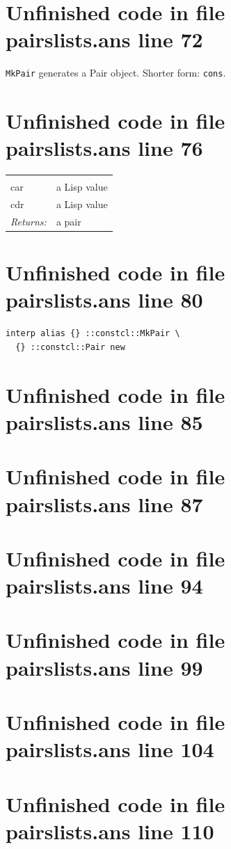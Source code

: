 \documentclass[twoside,9pt]{report}
\begin{document}
\section{Unfinished code in file pairslists.ans line 72}


\texttt{MkPair} generates a Pair object. Shorter form: \texttt{cons}.

\section{Unfinished code in file pairslists.ans line 76}
\noindent\begin{tabular}{ |p{1.9cm} p{8cm}| }
\hline
\rowcolor[HTML]{CCCCCC} \multicolumn{2}{|l|}{\bf MkPair (internal)} \\
car & a Lisp value \\
cdr & a Lisp value \\
\textit{Returns:} & a pair \\
\hline
\end{tabular}
\section{Unfinished code in file pairslists.ans line 80}
\begin{lstlisting}
interp alias {} ::constcl::MkPair \
  {} ::constcl::Pair new
\end{lstlisting}
\section{Unfinished code in file pairslists.ans line 85}
\section{Unfinished code in file pairslists.ans line 87}
\section{Unfinished code in file pairslists.ans line 94}
\section{Unfinished code in file pairslists.ans line 99}
\section{Unfinished code in file pairslists.ans line 104}
\section{Unfinished code in file pairslists.ans line 110}
\end{document}
